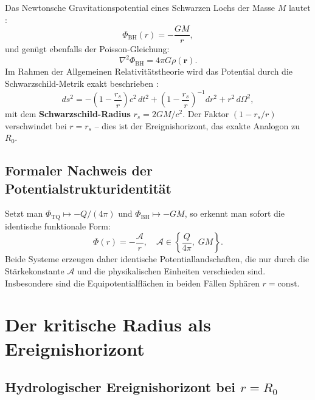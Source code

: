 ﻿\documentclass[12pt,a4paper]{report}
\begin{document}
Das Newtonsche Gravitationspotential eines Schwarzen Lochs der Masse $M$ lautet \cite{misner1973}:
\begin{equation}
	\Phi_{\mathrm{BH}}(r) = -\frac{GM}{r},
	\label{eq:potential_bh}
\end{equation}
und genügt ebenfalls der Poisson-Gleichung:
\begin{equation}
	\nabla^2 \Phi_{\mathrm{BH}} = 4\pi G\rho(\mathbf{r}).
	\label{eq:poisson_bh}
\end{equation}
Im Rahmen der Allgemeinen Relativitätstheorie wird das Potential durch die Schwarzschild-Metrik exakt beschrieben \cite{schwarzschild1916}:
\begin{equation}
	ds^2 = -\left(1 - \frac{r_s}{r}\right)c^2\,dt^2 + \left(1-\frac{r_s}{r}\right)^{-1}dr^2 + r^2\,d\Omega^2,
	\label{eq:schwarzschild_metrik}
\end{equation}
mit dem \textbf{Schwarzschild-Radius} $r_s = 2GM/c^2$. Der Faktor $(1 - r_s/r)$ verschwindet bei $r = r_s$ -- dies ist der Ereignishorizont, das exakte Analogon zu $R_0$.

\subsection{Formaler Nachweis der Potentialstrukturidentität}

Setzt man $\Phi_{\mathrm{TQ}} \mapsto -Q/(4\pi)$ und $\Phi_{\mathrm{BH}} \mapsto -GM$, so erkennt man sofort die identische funktionale Form:
\begin{equation}
	\boxed{\Phi(r) = -\frac{\mathcal{A}}{r}, \quad \mathcal{A} \in \left\{\frac{Q}{4\pi},\; GM\right\}.}
	\label{eq:potential_identitaet}
\end{equation}
Beide Systeme erzeugen daher identische Potentiallandschaften, die nur durch die Stärke\-konstante $\mathcal{A}$ und die physikalischen Einheiten verschieden sind. Insbesondere sind die Equipotentialflächen in beiden Fällen Sphären $r = \mathrm{const}$.

\section{Der kritische Radius als Ereignishorizont}

\subsection{Hydrologischer Ereignishorizont bei $r = R_0$}
\end{document}
